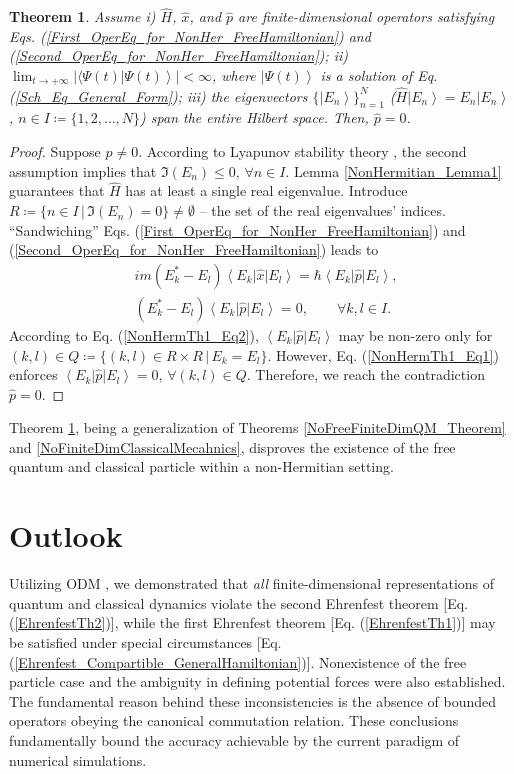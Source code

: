 \documentclass[twocolumn,pra,aps,showpacs,preprintnumbers,nofootinbib, superscriptaddress, amsmath,amssymb]{revtex4}
\newcommand*{\bra}[1]{\left\langle{#1}\right|}
\newcommand*{\ket}[1]{\left| #1 \right\rangle}
\newtheorem{theorem}{Theorem}
\begin{document}
\begin{theorem}\label{NonHermitian_Theorem1}
	Assume i) $\hat{H}$, $\hat{x}$, and $\hat{p}$ are finite-dimensional operators satisfying Eqs. (\ref{First_OperEq_for_NonHer_FreeHamiltonian}) and (\ref{Second_OperEq_for_NonHer_FreeHamiltonian}); ii) $\lim_{t \to +\infty} \left| \langle \Psi(t) \ket{\Psi(t)} \right| < \infty$, where $\ket{\Psi(t)}$ is a solution of Eq. (\ref{Sch_Eq_General_Form}); iii) the eigenvectors $\{ \ket{E_n} \}_{n=1}^N$ ($\hat{H}\ket{E_n} = E_n \ket{E_n}$, $n \in I \coloneqq \{1,2,\ldots,N\}$) span the entire Hilbert space. Then, $\hat{p} = 0$.
\end{theorem}
\begin{proof}
	Suppose $\hat{p} \neq 0$. According to Lyapunov stability theory \cite{Lyapunov1992}, the second assumption implies that $\Im(E_n) \leqslant 0$, $\forall n\in I$. Lemma \ref{NonHermitian_Lemma1} guarantees that $\hat{H}$ has at least a single real eigenvalue. Introduce $R \coloneqq \{ n \in I \, | \, \Im(E_n) = 0 \} \neq \emptyset$ -- the set of the real eigenvalues' indices. 
	``Sandwiching'' Eqs. (\ref{First_OperEq_for_NonHer_FreeHamiltonian}) and (\ref{Second_OperEq_for_NonHer_FreeHamiltonian}) leads to
	\begin{align}
		& im ( E_k^* - E_l ) \bra{E_k} \hat{x} \ket{E_l} = \hbar \bra{E_k} \hat{p} \ket{E_l}, \label{NonHermTh1_Eq1}\\
		& ( E_k^* - E_l ) \bra{E_k} \hat{p} \ket{E_l} = 0, \qquad \forall k,l \in I. \label{NonHermTh1_Eq2}
	\end{align}
	According to Eq. (\ref{NonHermTh1_Eq2}), $\bra{E_k} \hat{p} \ket{E_l}$ may be non-zero only for $(k,l) \in Q \coloneqq \{ (k,l) \in R \times R \, | \, E_k = E_l \}$. However, Eq. (\ref{NonHermTh1_Eq1}) enforces $\bra{E_k} \hat{p} \ket{E_l} = 0$, $\forall (k,l) \in Q$. Therefore, we reach the contradiction $\hat{p} = 0$.
\end{proof}

Theorem \ref{NonHermitian_Theorem1}, being a generalization of Theorems \ref{NoFreeFiniteDimQM_Theorem} and \ref{NoFiniteDimClassicalMecahnics}, disproves the existence of the free quantum and classical particle within a non-Hermitian setting.

\section{Outlook}

Utilizing ODM \cite{Bondar2011c}, we demonstrated that {\it all} finite-dimensional representations of quantum and classical dynamics  violate the second Ehrenfest theorem [Eq. (\ref{EhrenfestTh2})], while the first Ehrenfest theorem [Eq. (\ref{EhrenfestTh1})] may be satisfied under special circumstances [Eq. (\ref{Ehrenfest_Compartible_GeneralHamiltonian})].  Nonexistence of the free particle case and the ambiguity in defining potential forces were also established. The fundamental reason behind these inconsistencies is the absence of bounded operators obeying the canonical commutation relation. These conclusions fundamentally bound the accuracy achievable by the current paradigm of numerical simulations.
\end{document}
